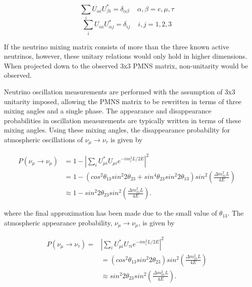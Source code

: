 \begin{equation}
\sum_i U_{\alpha i} U_{\beta i}^* = \delta_{\alpha \beta} \;\;\;\; \alpha,\beta=e, \mu, \tau
\label{eqn:unitarity_condition_flavor}
\end{equation}
\begin{equation}
\sum_i U_{\alpha i} U_{\alpha j}^* = \delta_{ij} \;\;\;\; i,j=1,2,3
\label{eqn:unitarity_condition_mass}
\end{equation}

If the neutrino mixing matrix consists of more than the three known active neutrinos, however, these unitary relations would only hold in higher dimensions.
When projected down to the observed 3x3 PMNS matrix, non-unitarity would be observed.

Neutrino oscillation measurements are performed with the assumption of 3x3 unitarity imposed, allowing the PMNS matrix to be rewritten in terms of three mixing angles and a single phase.
The appearance and disappearance probabilities in oscillation measurements are typically written in terms of these mixing angles.
Using these mixing angles, the disappearance probability for atmospheric oscillations of $\nu_\mu \rightarrow \nu_\tau$ is given by

\begin{equation}
\begin{aligned}
P\left(\nu_\mu\rightarrow\nu_\mu\right) &{}=  1 -  \left| \sum_i U^*_{\mu i} U_{\mu i} e^{-i m_i^2 L/2E} \right|^2 \\
 						&{}= 1 - \left( cos^2 \theta_{13} sin^2 2 \theta_{23} + sin^4 \theta_{23} sin^2 2 \theta_{13} \right) sin^2 \left( \frac{\Delta m^2_{31} L}{4 E} \right) \\
 						&{}\approx 1 - sin^2 2 \theta_{23} sin^2 \left(\frac{\Delta m^2_{31} L}{4 E} \right).
\end{aligned}
\label{eqn:mu_disappearance_probability}
\end{equation}

where the final approximation has been made due to the small value of $\theta_{13}$.
The atmospheric appearance probability, $\nu_\mu \rightarrow \nu_\mu$, is given by

\begin{equation}
\begin{aligned}
P\left(\nu_\mu\rightarrow\nu_\tau\right) {}= &  \left| \sum_i U^*_{\mu i} U_{\tau i} e^{-i m_i^2 L/2E} \right|^2 \\
 						&{}= \left( cos^2 \theta_{13} sin^2 2 \theta_{23} \right) sin^2 \left( \frac{\Delta m^2_{31} L}{4 E} \right) \\
						&{}\approx sin^2 2 \theta_{23} sin^2 \left(\frac{\Delta m^2_{31} L}{4 E} \right).
\end{aligned}
\label{eqn:tau_appearance_probability}
\end{equation}

